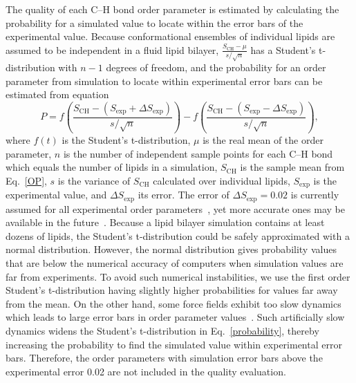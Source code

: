 \documentclass[fleqn,10pt]{wlscirep}
\begin{document}
The quality of each C--H bond order parameter is estimated by calculating the probability for a simulated value to locate within the error bars of the experimental value. Because conformational ensembles of individual lipids are assumed to be independent in a fluid lipid bilayer, $\frac{S_\mathrm{CH}-\mu}{s/\sqrt{n}}$ has a Student's t-distribution with $n-1$ degrees of freedom, and the probability for an order parameter from simulation to locate within experimental error bars can be estimated from equation
\begin{equation}\label{probability}
  P = f \left( \frac{S_\mathrm{CH} - (S_\mathrm{exp}+\Delta S_\mathrm{exp})}{s/\sqrt{n}} \right) - f \left( \frac{S_\mathrm{CH} - (S_\mathrm{exp}-\Delta S_\mathrm{exp})}{s/\sqrt{n}} \right),
\end{equation}
where $f(t)$ is the %
Student's t-distribution, $\mu$ is the real mean of the order parameter, $n$ is the number of independent sample points for each C--H bond which equals the number of lipids in a simulation, $S_\mathrm{CH}$ is the sample mean from Eq.~\ref{OP}, $s$ is the variance of $S_\mathrm {CH}$ calculated over individual lipids, $S_\mathrm{exp}$ is the experimental value, and $\Delta S_\mathrm{exp}$ its error. The error of $\Delta S_\mathrm{exp} = 0.02$ is currently assumed for all experimental order parameters~\cite{ollila16}, yet more accurate ones may be available in the future~\cite{wurl22}. Because a lipid bilayer simulation contains at least dozens of lipids, the Student's t-distribution could be safely approximated with a normal distribution. However, the normal distribution gives probability values that are below the numerical accuracy of computers when simulation values are far from experiments. To avoid such numerical instabilities, we use the first order Student's t-distribution having slightly higher probabilities for values far away from the mean. On the other hand, some force fields exhibit too slow dynamics which leads to large error bars in order parameter values~\cite{antila21a}. Such artificially slow dynamics widens the Student's t-distribution in Eq.~\ref{probability}, thereby increasing the probability to find the simulated value within experimental error bars. Therefore, the order parameters with simulation error bars above the experimental error 0.02 are not included in the quality evaluation.
\end{document}
